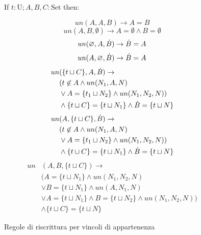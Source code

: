 \documentclass[12pt,a4paper,openright]{book} %
\begin{document}
\begin{figure}
	\begin{tcolorbox}[colframe=black, colback=white, sharp corners]
		\setcounter{equation}{0}
		\renewcommand{\theequation}{$\cup$\textsubscript{\arabic{equation}}}

		If $t: \text{U}; A, B, C: \text{Set}$ then:

		\begin{equation}
		un(A,A,B) \to A = B
		\end{equation}
		\begin{equation}
		un(A,B,\emptyset) \to A = \emptyset \land B = \emptyset
		\end{equation}
		\begin{equation}
		un(\varnothing,A,\dot{B}) \to \dot{B} = A
		\end{equation}
		\begin{equation}
		un(A,\varnothing,\dot{B}) \to \dot{B} = A
		\end{equation}
		\begin{equation}
		\begin{split}
		un & (\{ t \sqcup C \}, A, \dot{B}) \to \\
		& (t \not\in A \land un(N_1, A, N) \\
		& \lor A = \{ t_1 \sqcup N_2 \} \land un(N_1, N_2, N) ) \\
		& \land \{ t\sqcup C \} = \{ t \sqcup N_1 \} \land \dot{B} = \{ t\sqcup N \}
		\end{split}
		\end{equation}
		\begin{equation}
		\begin{split}
		un & (A, \{ t \sqcup C \}, \dot{B}) \to \\
		& (t \not\in A \land un(N_1, A, N) \\
		& \lor A = \{ t_1 \sqcup N_2 \} \land un(N_1, N_2, N) ) \\
		& \land \{ t\sqcup C \} = \{ t \sqcup N_1 \} \land \dot{B} = \{ t\sqcup N \}
		\end{split}
		\end{equation}
		\begin{equation}
		\begin{split}
		un & (A, B, \{ t \sqcup C \}) \to \\
		& (A = \{t \sqcup N_1 \} \land un(N_1, N_2, N) \\
		& \lor B = \{ t \sqcup N_1 \} \land un(A, N_1, N) \\
		& \lor A = \{ t \sqcup N_1 \} \land B = \{ t \sqcup N_2 \} \land un(N_1, N_2, N) ) \\
		& \land \{ t \sqcup C \} = \{ t \sqcup N \}
		\end{split}
		\end{equation}

	\end{tcolorbox}

	\caption{Regole di riscrittura per vincoli di appartenenza}
	\label{fig:un_constraints}
\end{figure}
\end{document}
